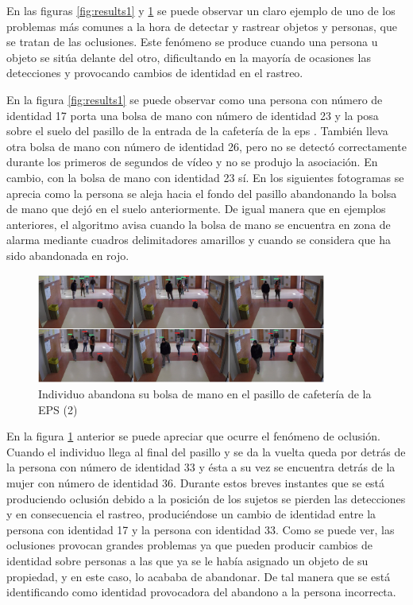 En las figuras \ref{fig:results1} y \ref{fig:results2} se puede observar un claro ejemplo de uno de los problemas más comunes a la hora de detectar y rastrear objetos y personas, que se tratan de las oclusiones. Este fenómeno se produce cuando una persona u objeto se sitúa delante del otro, dificultando en la mayoría de ocasiones las detecciones y provocando cambios de identidad en el rastreo.

En la figura \ref{fig:results1} se puede observar como una persona con número de identidad 17 porta una bolsa de mano con número de identidad 23 y la posa sobre el suelo del pasillo de la entrada de la cafetería de la \gls{eps} \cite{gba-dataset}. También lleva otra bolsa de mano con número de identidad 26, pero no se detectó correctamente durante los primeros de segundos de vídeo y no se produjo la asociación. En cambio, con la bolsa de mano con identidad 23 sí. En los siguientes fotogramas se aprecia como la persona se aleja hacia el fondo del pasillo abandonando la bolsa de mano que dejó en el suelo anteriormente. De igual manera que en ejemplos anteriores, el algoritmo avisa cuando la bolsa de mano se encuentra en zona de alarma mediante cuadros delimitadores amarillos y cuando se considera que ha sido abandonada en rojo.

\begin{figure}[ht]
\centering
\includegraphics[width=0.85\textwidth]{img/chapters/resultados/abandono/2.png}
\caption{\label{fig:results2}Individuo abandona su bolsa de mano en el pasillo de cafetería de la EPS (2) \cite{gba-dataset}}
\end{figure}

En la figura \ref{fig:results2} anterior se puede apreciar que ocurre el fenómeno de oclusión. Cuando el individuo llega al final del pasillo y se da la vuelta queda por detrás de la persona con número de identidad 33 y ésta a su vez se encuentra detrás de la mujer con número de identidad 36. Durante estos breves instantes que se está produciendo oclusión debido a la posición de los sujetos se pierden las detecciones y en consecuencia el rastreo, produciéndose un cambio de identidad entre la persona con identidad 17 y la persona con identidad 33. Como se puede ver, las oclusiones provocan grandes problemas ya que pueden producir cambios de identidad sobre personas a las que ya se le había asignado un objeto de su propiedad, y en este caso, lo acababa de abandonar. De tal manera que se está identificando como identidad provocadora del abandono a la persona incorrecta.

